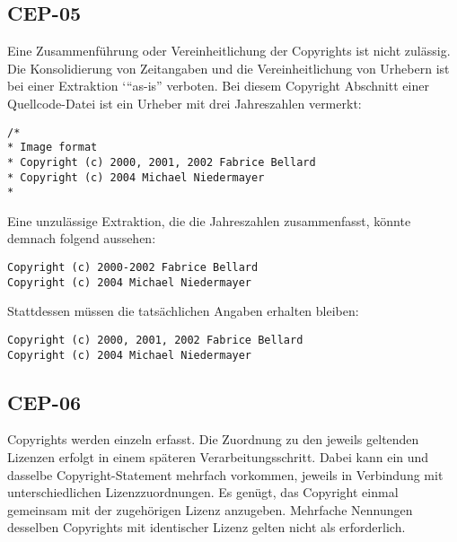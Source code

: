 
\subsection{CEP-05}\label{subsec:cep-05}

Eine Zusammenführung oder Vereinheitlichung der Copyrights ist nicht zulässig.
Die Konsolidierung von Zeitangaben und die Vereinheitlichung von Urhebern ist bei einer Extraktion `\enquote{as-is} verboten.
Bei diesem Copyright Abschnitt einer Quellcode-Datei ist ein Urheber mit drei Jahreszahlen vermerkt:

\begin{lstlisting}[numbers=none, keepspaces=true]
/*
* Image format
* Copyright (c) 2000, 2001, 2002 Fabrice Bellard
* Copyright (c) 2004 Michael Niedermayer
*
\end{lstlisting}

Eine unzulässige Extraktion, die die Jahreszahlen zusammenfasst, könnte demnach folgend aussehen:

\begin{lstlisting}[numbers=none, keepspaces=true]
Copyright (c) 2000-2002 Fabrice Bellard
Copyright (c) 2004 Michael Niedermayer
\end{lstlisting}

Stattdessen müssen die tatsächlichen Angaben erhalten bleiben:

\begin{lstlisting}[numbers=none, keepspaces=true]
Copyright (c) 2000, 2001, 2002 Fabrice Bellard
Copyright (c) 2004 Michael Niedermayer
\end{lstlisting}


\subsection{CEP-06}\label{subsec:cep-06}

Copyrights werden einzeln erfasst.
Die Zuordnung zu den jeweils geltenden Lizenzen erfolgt in einem späteren Verarbeitungsschritt.
Dabei kann ein und dasselbe Copyright-Statement mehrfach vorkommen, jeweils in Verbindung mit unterschiedlichen Lizenzzuordnungen.
Es genügt, das Copyright einmal gemeinsam mit der zugehörigen Lizenz anzugeben.
Mehrfache Nennungen desselben Copyrights mit identischer Lizenz gelten nicht als erforderlich.

